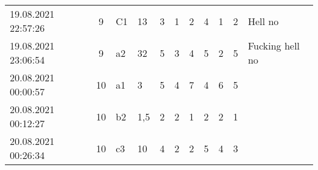 \begin{landscape}
\begin{table}[]
\begin{tabular}{lcllccccccp{7cm}}
19.08.2021 22:57:26 & 9         & C1                & 13        & 3  & 1  & 2  & 4  & 1  & 2  & Hell no                                                   \\
19.08.2021 23:06:54 & 9         & a2                & 32        & 5  & 3  & 4  & 5  & 2  & 5  & Fucking hell no                                           \\
20.08.2021 00:00:57 & 10        & a1                & 3         & 5  & 4  & 7  & 4  & 6  & 5  &                                                           \\
20.08.2021 00:12:27 & 10        & b2                & 1,5       & 2  & 2  & 1  & 2  & 2  & 1  &                                                           \\
20.08.2021 00:26:34 & 10        & c3                & 10        & 4  & 2  & 2  & 5  & 4  & 3  &
\end{tabular}
\end{table}
\end{landscape}

